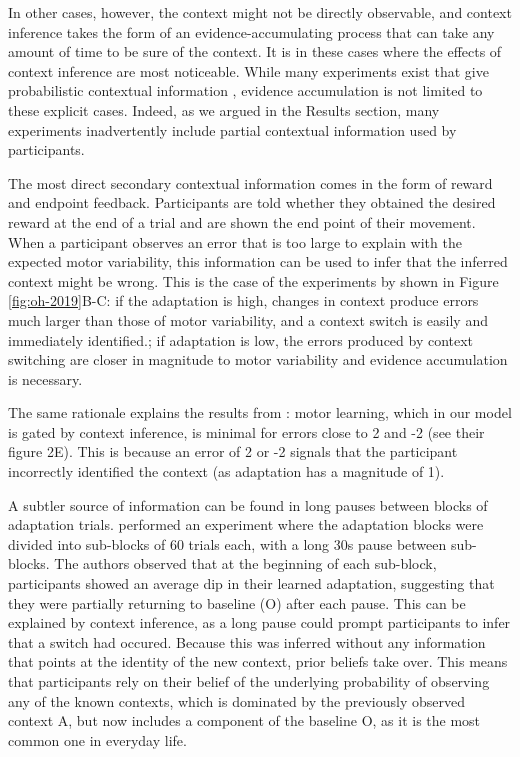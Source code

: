 \documentclass[a4paper,doc,floatsintext,natbib]{apa6}
\def \fref #1{Figure \ref{#1}}     %
\begin{document}
In other cases, however, the context might not be directly observable, and context inference takes the form of an evidence-accumulating process that can take any amount of time to be sure of the context. It is in these cases where the effects of context inference are most noticeable. While many experiments exist that give probabilistic contextual information \cite[e.g.][]{Scholz_uncontrolled_1999,Behrens_Learning_2007,Nassar_Dissociable_2019}, evidence accumulation is not limited to these explicit cases. Indeed, as we argued in the Results section, many experiments inadvertently include partial contextual information used by participants.

The most direct secondary contextual information comes in the form of reward and endpoint feedback. Participants are told whether they obtained the desired reward at the end of a trial and are shown the end point of their movement. When a participant observes an error that is too large to explain with the expected motor variability, this information can be used to infer that the inferred context might be wrong. This is the case of the experiments by \cite{Oh_Minimizing_2019} shown in \fref{fig:oh-2019}B-C: if the adaptation is high, changes in context produce errors much larger than those of motor variability, and a context switch is easily and immediately identified.; if adaptation is low, the errors produced by context switching are closer in magnitude to motor variability and evidence accumulation is necessary.

The same rationale explains the results from \cite{Davidson_Scaling_2004}: motor learning, which in our model is gated by context inference, is minimal for errors close to 2 and -2 (see their figure 2E). This is because an error of 2 or -2 signals that the participant incorrectly identified the context (as adaptation has a magnitude of 1).

A subtler source of information can be found in long pauses between blocks of adaptation trials. \cite{Ethier_Spontaneous_2008} performed an experiment where the adaptation blocks were divided into sub-blocks of 60 trials each, with a long 30s pause between sub-blocks. The authors observed that at the beginning of each sub-block, participants showed an average dip in their learned adaptation, suggesting that they were partially returning to baseline (O) after each pause. This can be explained by context inference, as a long pause could prompt participants to infer that a switch had occured. Because this was inferred without any information that points at the identity of the new context, prior beliefs take over. This means that participants rely on their belief of the underlying probability of observing any of the known contexts, which is dominated by the previously observed context A, but now includes a component of the baseline O, as it is the most common one in everyday life.
\end{document}
